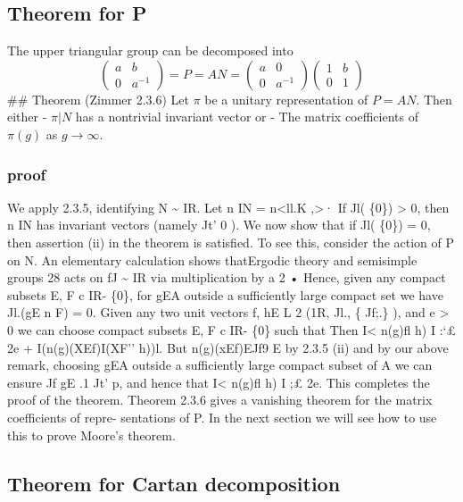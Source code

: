 \documentclass[
]{article}
\begin{document}
\hypertarget{theorem-for-p}{%
\subsection{Theorem for P}\label{theorem-for-p}}

The upper triangular group can be decomposed into
\[\begin{pmatrix}a & b \\ 0 & a^{-1}\end{pmatrix} =
P = AN =
\begin{pmatrix}a & 0 \\ 0 & a^{-1}\end{pmatrix} \begin{pmatrix}1 & b \\ 0 & 1\end{pmatrix}\]
\#\# Theorem (Zimmer 2.3.6) Let \(\pi\) be a unitary representation of
\(P = AN\). Then either - \(\pi|N\) has a nontrivial invariant vector or
- The matrix coefficients of \(\pi(g)\) as \(g \rightarrow \infty\).

\hypertarget{proof}{%
\subsubsection{proof}\label{proof}}


 We apply 2.3.5, identifying N \textasciitilde{}
IR. Let n IN = n\textless ll.K ,\textgreater· If Jl( \{0\})
\textgreater{} 0, then n IN has invariant vectors (namely Jt' 0 ). We
now show that if Jl( \{0\}) = 0, then assertion (ii) in the theorem is
satisfied. To see this, consider the action of P on N. An elementary
calculation shows thatErgodic theory and semisimple groups 28 acts on fJ
\textasciitilde{} IR via multiplication by a 2 • Hence, given any
compact subsets E, F c IR- \{0\}, for gEA outside a sufficiently large
compact set we have Jl.(gE n F) = 0. Given any two unit vectors f, hE L
2 (1R, Jl., \{ Jf;.\} ), and e \textgreater{} 0 we can choose compact
subsets E, F c IR- \{0\} such that Then I\textless{} n(g)fl h) I :`£ 2e
+ I(n(g)(XEf)I(XF'' h))l. But n(g)(xEf)EJf9 E by 2.3.5 (ii) and by our
above remark, choosing gEA outside a sufficiently large compact subset
of A we can ensure Jf gE .1 Jt' p, and hence that I\textless{} n(g)fl h)
I ;£ 2e. This completes the proof of the theorem. Theorem 2.3.6 gives a
vanishing theorem for the matrix coefficients of repre- sentations of P.
In the next section we will see how to use this to prove Moore's
theorem.

\hypertarget{theorem-for-cartan-decomposition}{%
\subsection{Theorem for Cartan
decomposition}\label{theorem-for-cartan-decomposition}}
\end{document}
